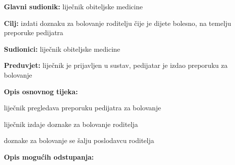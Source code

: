                      \noindent {}
					\begin{packed_item}
	
						\item \textbf{Glavni sudionik: }liječnik obiteljske medicine
						\item  \textbf{Cilj:} izdati doznaku za bolovanje roditelju čije je dijete bolesno, na temelju preporuke pedijatra
						\item  \textbf{Sudionici:} liječnik obiteljske medicine
						\item  \textbf{Preduvjet:} liječnik je prijavljen u sustav, pedijatar je izdao preporuku za bolovanje
						\item  \textbf{Opis osnovnog tijeka:}
						
						\item[] \begin{packed_enum}
	
							\item liječnik pregledava preporuku pedijatra za bolovanje
							\item liječnik izdaje doznake za bolovanje roditelja
							\item doznake za bolovanje se šalju poslodavcu roditelja

						\end{packed_enum}
						
						\item  \textbf{Opis mogućih odstupanja:}
						
						\item[] \begin{packed_item}
	
							\item[2.a] 
							\item[] \begin{packed_enum}
								
								\item 
								\item 
							\end{packed_enum}
							
						\end{packed_item}
					\end{packed_item}

